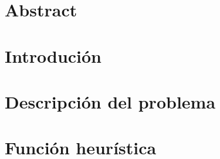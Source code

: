 \documentclass{article}
\begin{document}
    

    \tableofcontents
    \listoffigures
    \listoftables
    \newpage

    \section*{Abstract}
        
    
    \section{Introdución}
        
    
    \section{Descripción del problema}
        
    
    \section{Función heurística}
        
\end{document}
